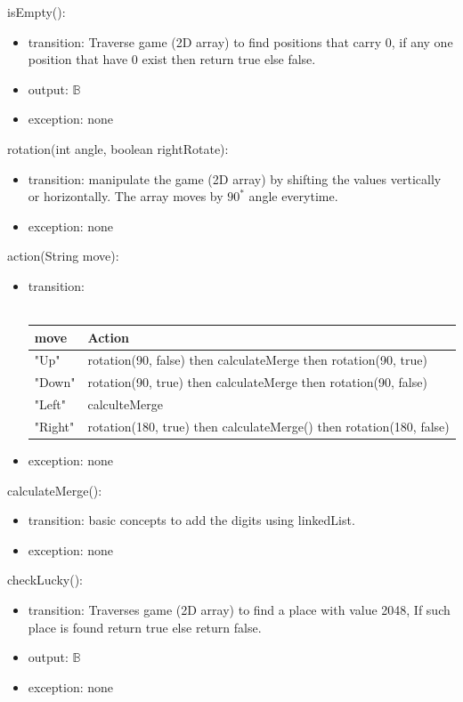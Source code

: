 \documentclass[12pt]{article}
\begin{document}
\noindent isEmpty():
\begin{itemize}
  \item transition: Traverse game (2D array) to find positions that carry 0, if any one position that have 0 exist then return true else false.
  \item output: $\mathbb{B}$   
  \item exception: none
\end{itemize}

\noindent rotation(int angle, boolean rightRotate):
\begin{itemize}
  \item transition: manipulate the game (2D array) by shifting the values vertically or horizontally. The array moves by $90^*$ angle everytime.
  \item exception: none
\end{itemize}

\noindent action(String move):
\begin{itemize}
  \item transition:\\\\
  \begin{tabular}{| l | l |}
\hline
\textbf{move} & \textbf{Action}\\
\hline
"Up" & rotation(90, false) then calculateMerge then rotation(90, true) \\
\hline
\hline
"Down" & rotation(90, true) then calculateMerge then rotation(90, false) \\
\hline
\hline
"Left" & calculteMerge \\
\hline
\hline
"Right" & rotation(180, true) then calculateMerge() then rotation(180, false) \\
\hline
\end{tabular}     
  \item exception: none
\end{itemize}

\noindent calculateMerge():
\begin{itemize}
  \item transition: basic concepts to add the digits using linkedList.
  \item exception: none
\end{itemize}

\noindent checkLucky():
\begin{itemize}
  \item transition: Traverses game (2D array) to find a place with value 2048, If such place is found return true else return false.
  \item output: $\mathbb{B}$
  \item exception: none
\end{itemize}
\end{document}
